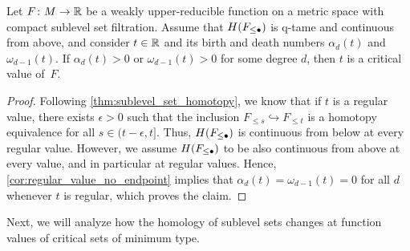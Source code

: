 \begin{lem}
\label{lem:endpoint_implies_crit_pt}
	Let $F \colon M \to \mathbb{R}$ be a weakly upper-reducible function on a metric space with compact sublevel set filtration.
	Assume that $H(F_{\leq \bullet})$ is q-tame and continuous from above, and consider $t \in \mathbb{R}$ and its birth and death numbers $\alpha_d(t)$ and $\omega_{d-1}(t)$.
	If $\alpha_d(t) > 0$ or $\omega_{d-1}(t) > 0$ for some degree $d$, then $t$ is a critical value of~$F$.
\end{lem}
\begin{proof}
	Following \cref{thm:sublevel_set_homotopy}, we know that if $t$ is a regular value, there exists $\epsilon > 0$ such that the inclusion $F_{\leq s} \hookrightarrow F_{\leq t}$ is a homotopy equivalence for all $s \in (t - \epsilon, t]$.
	Thus, $H(F_{\leq \bullet})$ is continuous from below at every regular value.
	However, we assume $H(F_{\leq \bullet})$ to be also continuous from above at every value, and in particular at regular values.
	Hence, \cref{cor:regular_value_no_endpoint} implies that $\alpha_d(t) = \omega_{d-1}(t) = 0$ for all $d$ whenever $t$ is regular, which proves the claim.
\end{proof}




Next, we will analyze how the homology of sublevel sets changes at function values of critical sets of minimum type.

